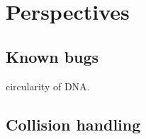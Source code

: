 
\section{Perspectives}

\subsection{Known bugs}

circularity of DNA.

\subsection{Collision handling}
